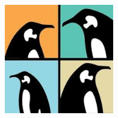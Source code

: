 \begin{frame}
\begin{columns}
\begin{center}
      \includegraphics[width=0.8\textwidth]{slides/linux-references/lpc-logo.jpg}\\
    \end{center}
  \end{columns}
\end{frame}

